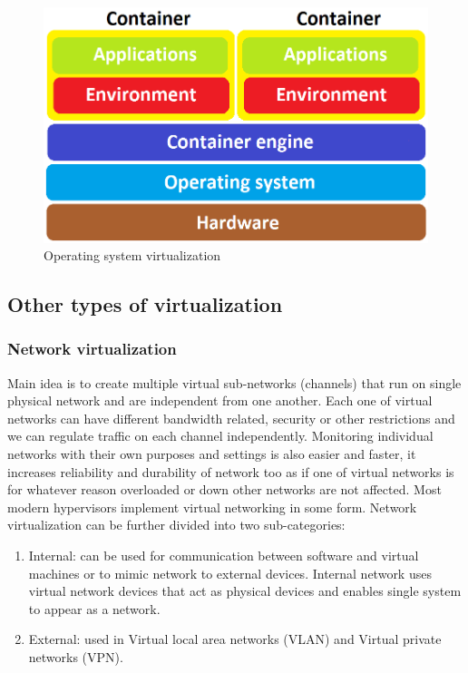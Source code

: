 \begin{figure}[H]
\centering
\includegraphics[scale=0.4]{container.png}
\caption{Operating system virtualization}
\end{figure}


\subsection{Other types of virtualization}
\subsubsection{Network virtualization}
Main idea is to create multiple virtual sub-networks (channels) that run on single physical network and are independent from one another. Each one of virtual networks can have different bandwidth related, security or other restrictions and we can regulate traffic on each channel independently.  Monitoring individual networks with their own purposes and settings is also easier and faster, it increases reliability and durability of network too as if one of virtual networks is for whatever reason overloaded or down other networks are not affected. Most modern hypervisors implement virtual networking in some form. Network virtualization can be further divided into two sub-categories:
\begin{enumerate}
\item Internal: can be used for communication between software and virtual machines or to mimic network to external devices. Internal network uses virtual network devices that act as physical devices and enables single system to appear as a network.
\item External: used in Virtual local area networks (VLAN) and Virtual private networks (VPN).
\end{enumerate}

